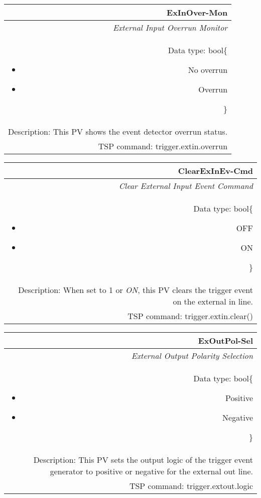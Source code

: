 \documentclass[openany]{article}
\begin{document}
		\begin{tabular}{N}
			\hline
			\bfseries ExInOver-Mon\label{pv:exinover-mon} \\ \hline
			\emph{External Input Overrun Monitor} \\
			Data type: bool\{\begin{itemize}[noitemsep]
				\small
				\item[] No overrun
				\item[] Overrun
			\end{itemize}\} \\
			Description: This PV shows the event detector overrun status. \\
			TSP command: trigger.extin.overrun
		\end{tabular}

		\begin{tabular}{N}
			\hline
			\bfseries ClearExInEv-Cmd\label{pv:clearexinev-cmd} \\ \hline
			\emph{Clear External Input Event Command} \\
			Data type: bool\{\begin{itemize}[noitemsep]
				\small
				\item[] OFF
				\item[] ON
			\end{itemize}\} \\
			Description: When set to 1 or \emph{ON}, this PV clears the trigger event on the external in line. \\
			TSP command: trigger.extin.clear()
		\end{tabular}

		\begin{tabular}{N}
			\hline
			\bfseries ExOutPol-Sel\label{pv:exoutpol-sel} \\ \hline
			\emph{External Output Polarity Selection} \\
			Data type: bool\{\begin{itemize}[noitemsep]
				\small
				\item[] Positive
				\item[] Negative
			\end{itemize}\} \\
			Description: This PV sets the output logic of the trigger event generator to positive or negative for the external out line. \\
			TSP command: trigger.extout.logic
		\end{tabular}
\end{document}
